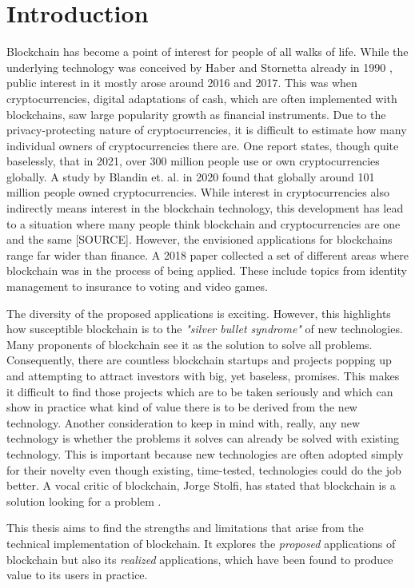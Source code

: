 \section{Introduction}

Blockchain has become a point of interest for people of all walks of
life. While the underlying technology was conceived by Haber and
Stornetta already in 1990 \cite{haber1990time}, public interest in it
mostly arose around 2016 and 2017. This was when cryptocurrencies,
digital adaptations of cash, which are often implemented with
blockchains, saw large popularity growth as financial instruments. Due
to the privacy-protecting nature of cryptocurrencies, it is difficult
to estimate how many individual owners of cryptocurrencies there are.
One report \cite{bbtcStats} states, though quite baselessly, that in
2021, over 300 million people use or own cryptocurrencies globally. A
study by Blandin et. al. in 2020 \cite{blandinBenchmark} found that
globally around 101 million people owned cryptocurrencies. While
interest in cryptocurrencies also indirectly means interest in the
blockchain technology, this development has lead to a situation where
many people think blockchain and cryptocurrencies are one and the same
[SOURCE]. However, the envisioned applications for blockchains range
far wider than finance. A 2018 paper \cite{kasparsUseCases} collected
a set of different areas where blockchain was in the process of being
applied. These include topics from identity management to insurance to
voting and video games.

The diversity of the proposed applications is exciting. However, this
highlights how susceptible blockchain is to the \textit{"silver bullet
syndrome"} of new technologies. Many proponents of blockchain see it
as the solution to solve all problems. Consequently, there are
countless blockchain startups and projects popping up and attempting
to attract investors with big, yet baseless, promises. This
makes it difficult to find those projects which are to be taken
seriously and which can show in practice what kind of value there is
to be derived from the new technology. Another consideration to keep
in mind with, really, any new technology is whether the problems it
solves can already be solved with existing technology. This is
important because new technologies are often adopted simply for their
novelty even though existing, time-tested, technologies could do the
job better. A vocal critic of blockchain, Jorge Stolfi, has stated
that blockchain is a solution looking for a problem
\cite{stolfiNISTReview}.

This thesis aims to find the strengths and limitations that arise from
the technical implementation of blockchain. It explores the
\textit{proposed} applications of blockchain but also its
\textit{realized} applications, which have been found to produce value
to its users in practice.

